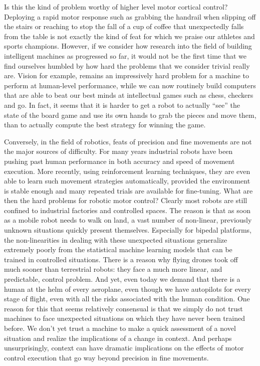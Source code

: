 Is this the kind of problem worthy of higher level motor cortical control? Deploying a rapid motor response such as grabbing the handrail when slipping off the stairs or reaching to stop the fall of a cup of coffee that unexpectedly falls from the table is not exactly the kind of feat for which we praise our athletes and sports champions. However, if we consider how research into the field of building intelligent machines as progressed so far, it would not be the first time that we find ourselves humbled by how hard the problems that we consider trivial really are. Vision for example, remains an impressively hard problem for a machine to perform at human-level performance, while we can now routinely build computers that are able to beat our best minds at intellectual games such as chess, checkers and go. In fact, it seems that it is harder to get a robot to actually ``see'' the state of the board game and use its own hands to grab the pieces and move them, than to actually compute the best strategy for winning the game.

Conversely, in the field of robotics, feats of precision and fine movements are not the major sources of difficulty. For many years industrial robots have been pushing past human performance in both accuracy and speed of movement execution. More recently, using reinforcement learning techniques, they are even able to learn such movement strategies automatically, provided the environment is stable enough and many repeated trials are available for fine-tuning. What are then the hard problems for robotic motor control? Clearly most robots are still confined to industrial factories and controlled spaces. The reason is that as soon as a mobile robot needs to walk on land, a vast number of non-linear, previously unknown situations quickly present themselves. Especially for bipedal platforms, the non-linearities in dealing with these unexpected situations generalize extremely poorly from the statistical machine learning models that can be trained in controlled situations. There is a reason why flying drones took off much sooner than terrestrial robots: they face a much more linear, and predictable, control problem. And yet, even today we demand that there is a human at the helm of every aeroplane, even though we have autopilots for every stage of flight, even with all the risks associated with the human condition. One reason for this that seems relatively consensual is that we simply do not trust machines to face unexpected situations on which they have never been trained before. We don't yet trust a machine to make a quick assessment of a novel situation and realize the implications of a change in context. And perhaps unsurprisingly, context can have dramatic implications on the effects of motor control execution that go way beyond precision in fine movements.

